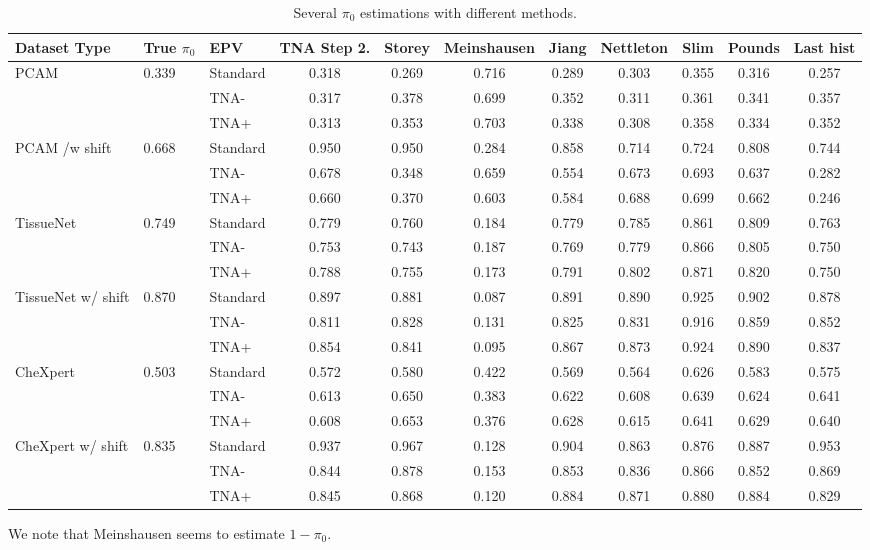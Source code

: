 \documentclass{article}
\begin{document}
\begin{table}[h!]
\footnotesize
	\caption{Several $\pi_0$ estimations with different methods.}
	\label{tab:pi0-est}
		\begin{tabular}{lll*{8}{c}}
			\toprule
			Dataset Type & True $\pi_0$ & EPV & {TNA Step 2.} & {Storey} & {Meinshausen} & {Jiang} & {Nettleton} & {Slim} & {Pounds} & {Last hist} \\
			\midrule
			\multirow{3}{*}{PCAM} & \multirow{3}{*}{0.339} & Standard & 0.318 & 0.269 & 0.716 & 0.289 & 0.303 & 0.355 & 0.316 & 0.257 \\
			&& TNA- & 0.317 & 0.378 & 0.699 & 0.352 & 0.311 & 0.361 & 0.341 & 0.357 \\
			&& TNA+ & 0.313 & 0.353 & 0.703 & 0.338 & 0.308 & 0.358 & 0.334 & 0.352 \\
			\cmidrule(lr){1-11}
			\multirow{3}{*}{PCAM /w shift} & \multirow{3}{*}{0.668}  & Standard & 0.950 & 0.950 & 0.284 & 0.858 & 0.714 & 0.724 & 0.808 & 0.744 \\
			&& TNA- & 0.678 & 0.348 & 0.659 & 0.554 & 0.673 & 0.693 & 0.637 & 0.282 \\
			&& TNA+ & 0.660 & 0.370 & 0.603 & 0.584 & 0.688 & 0.699 & 0.662 & 0.246 \\
			\bottomrule
			\multirow{3}{*}{TissueNet} & \multirow{3}{*}{0.749} & Standard & 0.779 & 0.760 & 0.184 & 0.779 & 0.785 & 0.861 & 0.809 & 0.763 \\
			&& TNA- & 0.753 & 0.743 & 0.187 & 0.769 & 0.779 & 0.866 & 0.805 & 0.750  \\ 
			&& TNA+ & 0.788 & 0.755 & 0.173 & 0.791 & 0.802 & 0.871 & 0.820 & 0.750  \\ 
			\cmidrule(lr){1-11}
			\multirow{3}{*}{TissueNet w/ shift} & \multirow{3}{*}{0.870} & Standard & 0.897 & 0.881 & 0.087 & 0.891 & 0.890 & 0.925 & 0.902 & 0.878 \\
			&& TNA- & 0.811 & 0.828 & 0.131 & 0.825 & 0.831 & 0.916 & 0.859 & 0.852  \\ 
			&& TNA+ & 0.854 & 0.841 & 0.095 & 0.867 & 0.873 & 0.924 & 0.890 & 0.837  \\
			\bottomrule
			\multirow{3}{*}{CheXpert}& \multirow{3}{*}{0.503} & Standard & 0.572 & 0.580 & 0.422 & 0.569 & 0.564 & 0.626 & 0.583 & 0.575 \\
			&& TNA- & 0.613 & 0.650 & 0.383 & 0.622 & 0.608 & 0.639 & 0.624 & 0.641 \\
			&& TNA+ & 0.608 & 0.653 & 0.376 & 0.628 & 0.615 & 0.641 & 0.629 & 0.640 \\
			\cmidrule(lr){1-11}
			\multirow{3}{*}{CheXpert w/ shift} & \multirow{3}{*}{0.835} &  Standard & 0.937 & 0.967 & 0.128 & 0.904 & 0.863 & 0.876 & 0.887 & 0.953 \\
			&& TNA- & 0.844 & 0.878 & 0.153 & 0.853 & 0.836 & 0.866 & 0.852 & 0.869 \\
			&& TNA+ & 0.845 & 0.868 & 0.120 & 0.884 & 0.871 & 0.880 & 0.884 & 0.829 \\
			\bottomrule
	\end{tabular}
\raggedright  We note that Meinshausen seems to estimate $1-\pi_0$.
\end{table}
\end{document}
